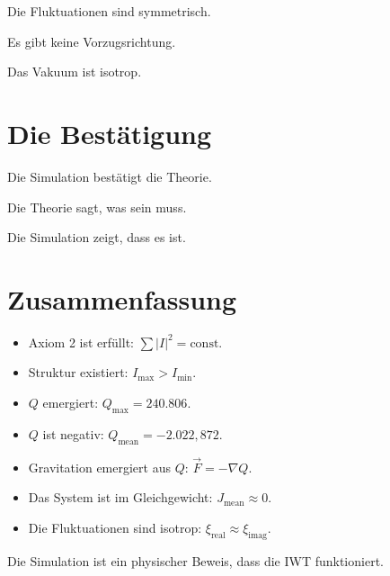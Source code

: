 Die Fluktuationen sind symmetrisch.

Es gibt keine Vorzugsrichtung.

Das Vakuum ist isotrop.

\section{Die Bestätigung}

Die Simulation bestätigt die Theorie.

Die Theorie sagt, was sein muss.

Die Simulation zeigt, dass es ist.

\section{Zusammenfassung}

\begin{itemize}
\item Axiom 2 ist erfüllt: \( \sum |I|^2 = \text{const} \).
\item Struktur existiert: \( I_{\text{max}} > I_{\text{min}} \).
\item \( Q \) emergiert: \( Q_{\text{max}} = 240.806 \).
\item \( Q \) ist negativ: \( Q_{\text{mean}} = -2.022,872 \).
\item Gravitation emergiert aus \( Q \): \( \vec{F} = -\nabla Q \).
\item Das System ist im Gleichgewicht: \( J_{\text{mean}} \approx 0 \).
\item Die Fluktuationen sind isotrop: \( \xi_{\text{real}} \approx \xi_{\text{imag}} \).
\end{itemize}

Die Simulation ist ein physischer Beweis, dass die IWT funktioniert.
